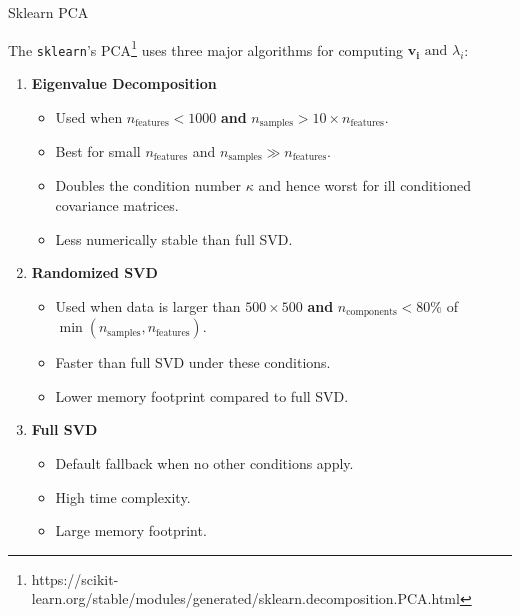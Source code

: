 \documentclass{beamer}
\begin{document}
\begin{frame}{Sklearn PCA}

The \texttt{sklearn}'s PCA\footnote{\scriptsize{https://scikit-learn.org/stable/modules/generated/sklearn.decomposition.PCA.html}} uses three major algorithms for computing $\mathbf{v_i} \text{ and } \lambda_i $:
\begin{enumerate}
    \item \textbf{Eigenvalue Decomposition} 
    \begin{itemize}
        \item Used when \( n_{\text{features}} < 1000 \) \textbf{and} \( n_{\text{samples}} > 10 \times n_{\text{features}} \).
        \item Best for small \( n_{\text{features}} \) and \( n_{\text{samples}} \gg n_{\text{features}} \).
        \item Doubles the condition number \( \kappa \) and hence worst for ill conditioned covariance matrices.
        \item Less numerically stable than full SVD.
    \end{itemize}

    \item \textbf{Randomized SVD} 
    \begin{itemize}
        \item Used when data is larger than \( 500 \times 500 \) \textbf{and} \( n_{\text{components}} < 80\% \) of \( \min(n_{\text{samples}}, n_{\text{features}}) \).
        \item Faster than full SVD under these conditions.
        \item Lower memory footprint compared to full SVD.
    \end{itemize}

    \item \textbf{Full SVD} 
    \begin{itemize}
        \item Default fallback when no other conditions apply.
        \item High time complexity.
        \item Large memory footprint.
    \end{itemize}
\end{enumerate}

\end{frame}


\end{document}
